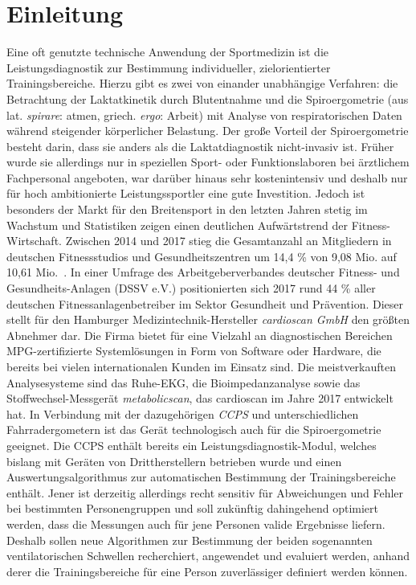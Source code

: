 \chapter{Einleitung}
%
Eine oft genutzte technische Anwendung der Sportmedizin ist die Leistungsdiagnostik zur Bestimmung individueller, zielorientierter Trainingsbereiche. Hierzu gibt es zwei von einander unabhängige Verfahren: die Betrachtung der Laktatkinetik durch Blutentnahme und die Spiroergometrie (aus lat. \textsl{spirare}: atmen, griech. \textsl{ergo}: Arbeit) mit Analyse von respiratorischen Daten während steigender körperlicher Belastung. Der große Vorteil der Spiroergometrie besteht darin, dass sie anders als die Laktatdiagnostik nicht-invasiv ist. Früher wurde sie allerdings nur in speziellen Sport- oder Funktionslaboren bei ärztlichem Fachpersonal angeboten, war darüber hinaus sehr kostenintensiv und deshalb nur für hoch ambitionierte Leistungssportler eine gute Investition. Jedoch ist besonders der Markt für den Breitensport in den letzten Jahren stetig im Wachstum und Statistiken zeigen einen deutlichen Aufwärtstrend der Fitness-Wirtschaft. Zwischen 2014 und 2017 stieg die Gesamtanzahl an Mitgliedern in deutschen Fitnessstudios und Gesundheitszentren um 14,4 \% von 9,08 Mio. auf 10,61 Mio.~\cite{DSSV.2018}. In einer Umfrage des Arbeitgeberverbandes deutscher Fitness- und Gesundheits-Anlagen (DSSV e.V.) positionierten sich 2017 rund 44 \% aller deutschen Fitnessanlagenbetreiber im Sektor Gesundheit und Prävention. Dieser stellt für den Hamburger Medizintechnik-Hersteller \textsl{cardioscan GmbH} den größten Abnehmer dar. Die Firma bietet für eine Vielzahl an diagnostischen Bereichen MPG-zertifizierte Systemlösungen in Form von Software oder Hardware, die bereits bei vielen internationalen Kunden im Einsatz sind. Die meistverkauften Analysesysteme sind das Ruhe-EKG, die Bioimpedanzanalyse sowie das Stoffwechsel-Messgerät \textsl{metabolicscan}, das cardioscan im Jahre 2017 entwickelt hat. In Verbindung mit der dazugehörigen \textsl{\gls{CCPS}} und unterschiedlichen Fahrradergometern ist das Gerät technologisch auch für die Spiroergometrie geeignet. Die \gls{CCPS} enthält bereits ein Leistungsdiagnostik-Modul, welches bislang mit Geräten von Drittherstellern betrieben wurde und einen Auswertungsalgorithmus zur automatischen Bestimmung der Trainingsbereiche enthält. Jener ist derzeitig allerdings recht sensitiv für Abweichungen und Fehler bei bestimmten Personengruppen und soll zukünftig dahingehend optimiert werden, dass die Messungen auch für jene Personen valide Ergebnisse liefern. Deshalb sollen neue Algorithmen zur Bestimmung der beiden sogenannten ventilatorischen Schwellen recherchiert, angewendet und evaluiert werden, anhand derer die Trainingsbereiche für eine Person zuverlässiger definiert werden können.
%
